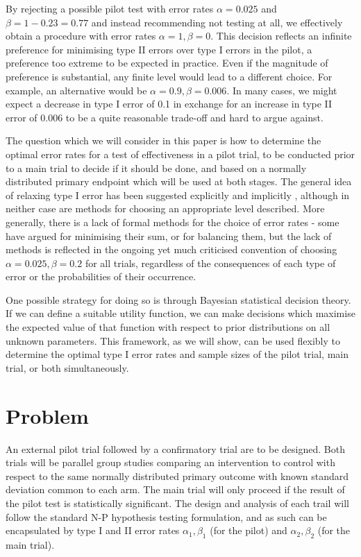 \documentclass[sagev]{sagej}
\begin{document}
By rejecting a possible pilot test with error rates $\alpha = 0.025$ and $\beta = 1 - 0.23 = 0.77$ and instead recommending not testing at all, we effectively obtain a procedure with error rates $\alpha = 1, \beta = 0$. This decision reflects an infinite preference for minimising type II errors over type I errors in the pilot, a preference too extreme to be expected in practice. Even if the magnitude of preference is substantial, any finite level would lead to a different choice. For example, an alternative would be $\alpha = 0.9, \beta = 0.006$. In many cases, we might expect a decrease in type I error of 0.1 in exchange for an increase in type II error of 0.006 to be a quite reasonable trade-off and hard to argue against.

The question which we will consider in this paper is how to determine the optimal error rates for a test of effectiveness in a pilot trial, to be conducted prior to a main trial to decide if it should be done, and based on a normally distributed primary endpoint which will be used at both stages. The general idea of relaxing type I error has been suggested explicitly \cite{Lee2014} and implicitly \cite{Cocks2013}, although in neither case are methods for choosing an appropriate level described. More generally, there is a lack of formal methods for the choice of error rates - some have argued for minimising their sum, or for balancing them, but the lack of methods is reflected in the ongoing yet much criticised convention of choosing $\alpha = 0.025, \beta = 0.2$ for all trials, regardless of the consequences of each type of error or the probabilities of their occurrence.

One possible strategy for doing so is through Bayesian statistical decision theory. If we can define a suitable utility function, we can make decisions which maximise the expected value of that function with respect to prior distributions on all unknown parameters. This framework, as we will show, can be used flexibly to determine the optimal type I error rates and sample sizes of the pilot trial, main trial, or both simultaneously.


\section{Problem}

An external pilot trial followed by a confirmatory trial are to be designed. Both trials will be parallel group studies comparing an intervention to control with respect to the same normally distributed primary outcome with known standard deviation common to each arm. The main trial will only proceed if the result of the pilot test is statistically significant. The design and analysis of each trail will follow the standard N-P hypothesis testing formulation, and as such can be encapsulated by type I and II error rates $\alpha_1, \beta_1$ (for the pilot) and  $\alpha_2, \beta_2$ (for the main trial).
\end{document}
